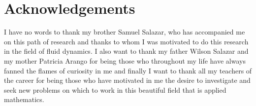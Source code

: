 \documentclass[12pt,letterpaper]{article}
\begin{document}
\section*{Acknowledgements}

I have no words to thank my brother Samuel Salazar, who has accompanied me on this path of research and thanks to whom I was motivated to do this research in the field of fluid dynamics. I also want to thank my father Wilson Salazar and my mother Patricia Arango for being those who throughout my life have always fanned the flames of curiosity in me and finally I want to thank all my teachers of the career for being those who have motivated in me the desire to investigate and seek new problems on which to work in this beautiful field that is applied mathematics.



\end{document}
